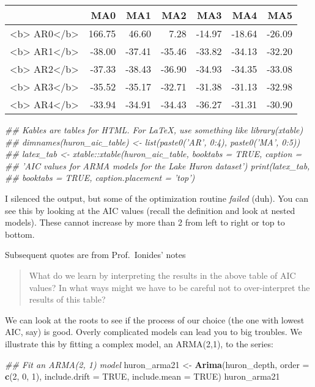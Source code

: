 \documentclass[]{book}
\newenvironment{Shaded}{\begin{snugshade}}{\end{snugshade}}
\newcommand{\CommentTok}[1]{\textcolor[rgb]{0.56,0.35,0.01}{\textit{#1}}}
\newcommand{\DataTypeTok}[1]{\textcolor[rgb]{0.13,0.29,0.53}{#1}}
\newcommand{\DecValTok}[1]{\textcolor[rgb]{0.00,0.00,0.81}{#1}}
\newcommand{\KeywordTok}[1]{\textcolor[rgb]{0.13,0.29,0.53}{\textbf{#1}}}
\newcommand{\NormalTok}[1]{#1}
\newcommand{\OtherTok}[1]{\textcolor[rgb]{0.56,0.35,0.01}{#1}}
\newcommand{\StringTok}[1]{\textcolor[rgb]{0.31,0.60,0.02}{#1}}
\begin{document}
\begin{tabular}{l|r|r|r|r|r|r}
\hline
  & MA0 & MA1 & MA2 & MA3 & MA4 & MA5\\
\hline
<b> AR0</b> & 166.75 & 46.60 & 7.28 & -14.97 & -18.64 & -26.09\\
\hline
<b> AR1</b> & -38.00 & -37.41 & -35.46 & -33.82 & -34.13 & -32.20\\
\hline
<b> AR2</b> & -37.33 & -38.43 & -36.90 & -34.93 & -34.35 & -33.08\\
\hline
<b> AR3</b> & -35.52 & -35.17 & -32.71 & -31.38 & -31.13 & -32.98\\
\hline
<b> AR4</b> & -33.94 & -34.91 & -34.43 & -36.27 & -31.31 & -30.90\\
\hline
\end{tabular}

\begin{Shaded}
\begin{Highlighting}[]
\CommentTok{## Kables are tables for HTML. For LaTeX, use something like library(xtable)}
\CommentTok{## dimnames(huron_aic_table) <- list(paste0('AR', 0:4), paste0('MA', 0:5))}
\CommentTok{## latex_tab <- xtable::xtable(huron_aic_table, booktabs = TRUE, caption =}
\CommentTok{## 'AIC values for ARMA models for the Lake Huron dataset') print(latex_tab,}
\CommentTok{## booktabs = TRUE, caption.placement = 'top')}
\end{Highlighting}
\end{Shaded}

I silenced the output, but some of the optimization routine
\emph{failed} (duh). You can see this by looking at the AIC values
(recall the definition and look at nested models). These cannot increase
by more than 2 from left to right or top to bottom.

Subsequent quotes are from Prof.~Ionides' notes

\begin{quote}
What do we learn by interpreting the results in the above table of AIC
values? In what ways might we have to be careful not to over-interpret
the results of this table?
\end{quote}

We can look at the roots to see if the process of our choice (the one
with lowest AIC, say) is good. Overly complicated models can lead you to
big troubles. We illustrate this by fitting a complex model, an
ARMA(2,1), to the series:

\begin{Shaded}
\begin{Highlighting}[]
\CommentTok{## Fit an ARMA(2, 1) model}
\NormalTok{huron_arma21 <-}\StringTok{ }\KeywordTok{Arima}\NormalTok{(huron_depth, }\DataTypeTok{order =} \KeywordTok{c}\NormalTok{(}\DecValTok{2}\NormalTok{, }\DecValTok{0}\NormalTok{, }\DecValTok{1}\NormalTok{), }\DataTypeTok{include.drift =} \OtherTok{TRUE}\NormalTok{, }
    \DataTypeTok{include.mean =} \OtherTok{TRUE}\NormalTok{)}
\NormalTok{huron_arma21}
\end{Highlighting}
\end{Shaded}
\end{document}
